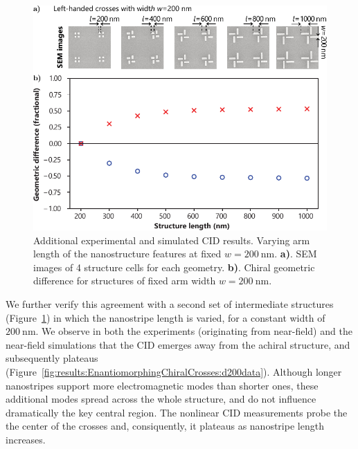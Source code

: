 \begin{figure}[htb!]	
    \centering	
    \includegraphics[scale=1]{./figures/results/EnantiomorphingChiralCrosses/d200structures.pdf}
    \caption{\label{fig:results:EnantiomorphingChiralCrosses:d200structures}
    Additional experimental and simulated CID results. Varying arm length of the nanostructure features at fixed $w=\SI{200}{\nano\m}$. \textbf{a)}. SEM images of 4 structure cells for each geometry. \textbf{b)}. Chiral geometric difference for structures of fixed arm width $w=\SI{200}{\nano\m}$.}	
\end{figure}

We further verify this agreement with a second set of intermediate structures (Figure~\ref{fig:results:EnantiomorphingChiralCrosses:d200structures}) in which the nanostripe length is varied, for a constant width of $\SI{200}{\nano\m}$. We observe in both the experiments (originating from near-field) and the near-field simulations that the CID emerges away from the achiral structure, and subsequently plateaus (Figure~\ref{fig:results:EnantiomorphingChiralCrosses:d200data}). Although longer nanostripes support more electromagnetic modes than shorter ones, these additional modes spread across the whole structure, and do not influence dramatically the key central region. The nonlinear CID measurements probe the the center of the crosses and, consiquently, it plateaus as nanostripe length increases.

